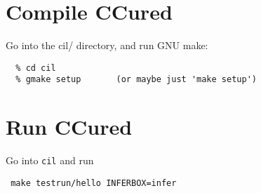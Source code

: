 \documentclass{book}
\def\t#1{{\tt #1}}
\begin{document}
\section{Compile CCured}

Go into the cil/ directory, and run GNU make:

\begin{verbatim}
  % cd cil
  % gmake setup       (or maybe just 'make setup')
\end{verbatim}

\section{Run CCured}

Go into \t{cil} and run
\begin{verbatim}
 make testrun/hello INFERBOX=infer
\end{verbatim}


\appendix
\end{document}
